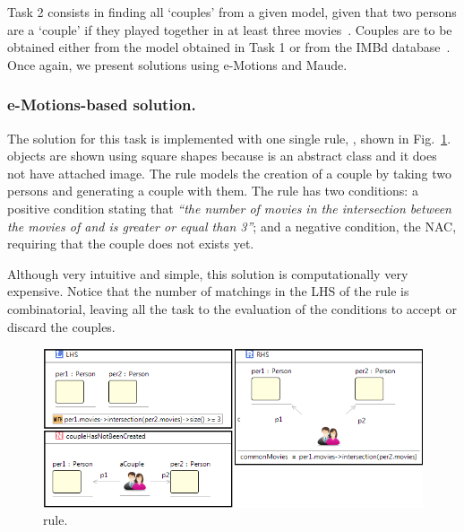 
Task 2 consists in finding all `couples' from a given model, given that two persons are a `couple' if they played together in at least three movies~\cite{imdbcase}. Couples are to be obtained either from the model obtained in Task 1 or from the IMBd database~\cite{imdbsources}. Once again, we present solutions using e-Motions and Maude.

\subsubsection{e-Motions-based solution.}

The solution for this task is implemented with one single rule, , shown in Fig.~\ref{fig:createCouple}.  objects are shown using square shapes because  is an abstract class and it does not have attached image. The  rule models the creation of a couple by taking two persons and generating a couple with them. The rule has two conditions: a positive condition stating that \textit{``the number of movies in the intersection between the movies of  and  is greater or equal than 3''}; and a negative condition, the  NAC, requiring that the couple does not exists yet. 

Although very intuitive and simple, this solution is computationally very expensive. Notice that the number of matchings in the LHS of the rule is combinatorial, leaving all the task to the evaluation of the conditions to accept or discard the couples. 

\begin{figure}[htp]
  \centering
  \includegraphics[width=\textwidth]{imgs/ruleCouples}
  \caption{ rule.}\label{fig:createCouple}
\end{figure}

